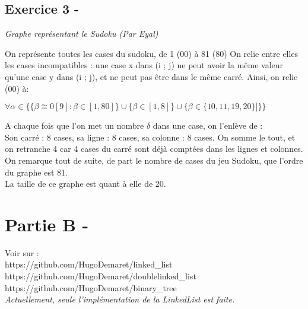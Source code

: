 \documentclass{article}
\begin{document}
\subsection*{Exercice 3 -}
\textit{Graphe représentant le Sudoku (Par Eyal)}
\begin{center}
\end{center}
\textsf{On représente toutes les cases du sudoku, de 1 (00) à 81 (80)}
\textsf{On relie entre elles les cases incompatibles : une case x dans (i ; j) ne peut avoir la même valeur qu'une case y dans (i ; j), et ne peut pas être dans le même carré.}
\textsf{Ainsi, on relie (00) à:}
\begin{center}
	$
		\forall \alpha \in \{\{\beta \cong 0 [9] : \beta \in [1,80] \}\cup \{\beta \in [1,8]\} \cup \{\beta \in \{10,11,19,20\}]\}\}
	$
\end{center}
\textsf{A chaque fois que l'on met un nombre $\delta$ dans une case, on l'enlève de :}\\
\textsf{Son carré : 8 cases, sa ligne : 8 cases, sa colonne : 8 cases.}
\textsf{On somme le tout, et on retranche 4 car 4 cases du carré sont déjà comptées dans les lignes et colonnes.}
\textsf{On remarque tout de suite, de part le nombre de cases du jeu Sudoku, que l'ordre du graphe est 81.}\\
\textsf{La taille de ce graphe est quant à elle de 20.}
\section*{Partie B -}
Voir sur :\\
	https://github.com/HugoDemaret/linked\_list\\
	https://github.com/HugoDemaret/doublelinked\_list\\
	https://github.com/HugoDemaret/binary\_tree\\
	\textit{Actuellement, seule l'implémentation de la LinkedList est faite.}
\end{document}
